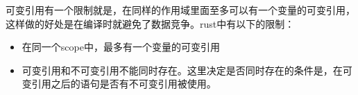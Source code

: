 \documentclass[12pt]{article}
\begin{document}
可变引用有一个限制就是，在同样的作用域里面至多可以有一个变量的可变引用，这样做的好处是在编译时就避免了数据竞争。rust中有以下的限制：

\begin{itemize}
\tightlist
\item
  在同一个scope中，最多有一个变量的可变引用
\item
  可变引用和不可变引用不能同时存在。这里决定是否同时存在的条件是，在可变引用之后的语句是否有不可变引用被使用。
\end{itemize}

\begin{Shaded}
\begin{Highlighting}[]
 \OperatorTok{=} \PreprocessorTok{::}\NormalTok{)}\OperatorTok{;}

\OperatorTok{=} \OperatorTok{\&}\OperatorTok{;} 
\OperatorTok{=} \OperatorTok{\&}\OperatorTok{;} 
\NormalTok{(}\OperatorTok{,}\OperatorTok{,}\OperatorTok{;}

\OperatorTok{=} \OperatorTok{\&}\OperatorTok{;} 
\NormalTok{(}\OperatorTok{,}\OperatorTok{;}
\end{Highlighting}
\end{Shaded}
\end{document}

